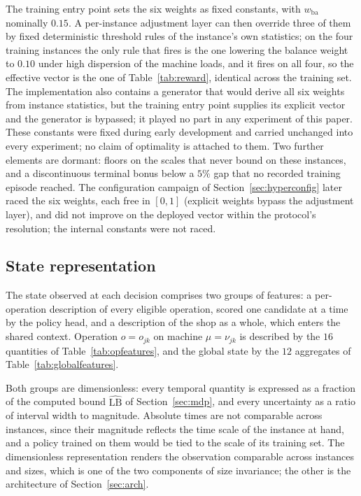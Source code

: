 \documentclass[preprint,12pt]{elsarticle}
\newcommand{\LBi}{\widehat{\mathrm{LB}}}
\theoremstyle{definition}
\theoremstyle{remark}
\begin{document}
The training entry point sets the six weights as fixed constants,
with $w_{\mathrm{ba}}$ nominally $0.15$. A per-instance adjustment
layer can then override three of them by fixed deterministic
threshold rules of the instance's own statistics; on the four
training instances the only rule that fires is the one lowering the
balance weight to $0.10$ under high dispersion of the machine loads,
and it fires on all four, so the effective vector is the one of
Table~\ref{tab:reward}, identical across the training set. The
implementation also contains a generator that would derive all six
weights from instance statistics, but the training entry point
supplies its explicit vector and the generator is bypassed; it played
no part in any experiment of this paper. These constants were fixed
during early development and carried unchanged into every experiment;
no claim of optimality is attached to them. Two further elements are
dormant: floors on the scales that never bound on these instances,
and a discontinuous terminal bonus below a $5\%$ gap that no recorded
training episode reached. The configuration campaign of
Section~\ref{sec:hyperconfig} later raced the six weights, each free
in $[0,1]$ (explicit weights bypass the adjustment layer), and did
not improve on the deployed vector within the protocol's resolution;
the internal constants were not raced.

\subsection{State representation}
\label{sec:features}

The state observed at each decision comprises two groups of
features: a per-operation description of every eligible operation,
scored one candidate at a time by the policy head, and a description
of the shop as a whole, which enters the shared context. Operation
$o=o_{jk}$ on machine $\mu=\nu_{jk}$ is described by the $16$
quantities of Table~\ref{tab:opfeatures}, and the global state by the
$12$ aggregates of Table~\ref{tab:globalfeatures}.

Both groups are dimensionless: every temporal quantity is expressed
as a fraction of the computed bound $\LBi$ of Section~\ref{sec:mdp},
and every uncertainty as a ratio of interval width to magnitude.
Absolute times are not comparable across instances, since their
magnitude reflects the time scale of the instance at hand, and a
policy trained on them would be tied to the scale of its training
set. The dimensionless representation renders the observation
comparable across instances and sizes, which is one of the two
components of size invariance; the other is the architecture of
Section~\ref{sec:arch}.
\end{document}
